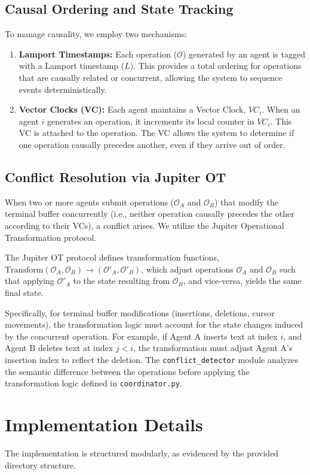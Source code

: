 \documentclass[11pt,a4paper]{article}
\begin{document}
\subsection{Causal Ordering and State Tracking}
To manage causality, we employ two mechanisms:
\begin{enumerate}
    \item \textbf{Lamport Timestamps:} Each operation ($\mathcal{O}$) generated by an agent is tagged with a Lamport timestamp ($L$). This provides a total ordering for operations that are causally related or concurrent, allowing the system to sequence events deterministically.
    \item \textbf{Vector Clocks (VC):} Each agent maintains a Vector Clock, $VC_i$. When an agent $i$ generates an operation, it increments its local counter in $VC_i$. This VC is attached to the operation. The VC allows the system to determine if one operation causally precedes another, even if they arrive out of order.
\end{enumerate}

\subsection{Conflict Resolution via Jupiter OT}
When two or more agents submit operations ($\mathcal{O}_A$ and $\mathcal{O}_B$) that modify the terminal buffer concurrently (i.e., neither operation causally precedes the other according to their VCs), a conflict arises. We utilize the Jupiter Operational Transformation protocol.

The Jupiter OT protocol defines transformation functions, $\text{Transform}(\mathcal{O}_A, \mathcal{O}_B) \rightarrow (\mathcal{O}'_A, \mathcal{O}'_B)$, which adjust operations $\mathcal{O}_A$ and $\mathcal{O}_B$ such that applying $\mathcal{O}'_A$ to the state resulting from $\mathcal{O}_B$, and vice-versa, yields the same final state.

Specifically, for terminal buffer modifications (insertions, deletions, cursor movements), the transformation logic must account for the state changes induced by the concurrent operation. For example, if Agent A inserts text at index $i$, and Agent B deletes text at index $j < i$, the transformation must adjust Agent A's insertion index to reflect the deletion. The \texttt{conflict\_detector} module analyzes the semantic difference between the operations before applying the transformation logic defined in \texttt{coordinator.py}.

\section{Implementation Details}
The implementation is structured modularly, as evidenced by the provided directory structure.
\end{document}
